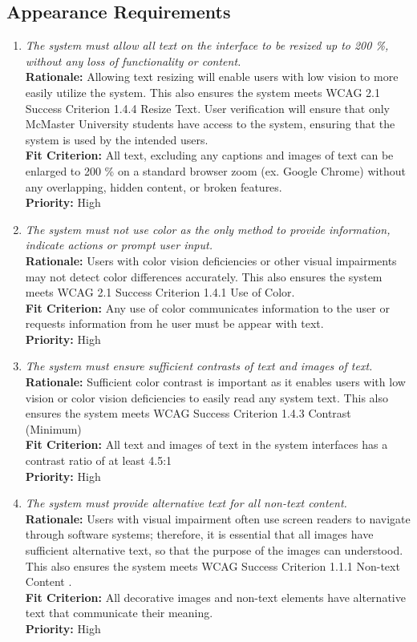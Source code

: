 \documentclass[12pt]{article}
\begin{document}
\subsection{Appearance Requirements}
\begin{enumerate}[label=LFR-AR \arabic*., wide=0pt, leftmargin=*]
  \item \emph{The system must allow all text on the interface to be resized up to 200 \%, without any loss of functionality or content. }\\[2mm] 
    {\bf Rationale:} Allowing text resizing will enable users with low vision to more easily utilize the system. This also ensures the system meets WCAG 2.1 Success Criterion 1.4.4 Resize Text.
    User verification will ensure that only McMaster University students have access to the system, ensuring that the system is used by the intended users.  \\
    {\bf Fit Criterion:} All text, excluding any captions and images of text can be enlarged to 200 \% on a standard browser zoom (ex. Google Chrome) without any overlapping, hidden content, or broken features.  \\
    {\bf Priority:} High
  \item \emph{The system must not use color as the only method to provide information, indicate actions or prompt user input.}\\[2mm] 
    {\bf Rationale:} Users with color vision deficiencies or other visual impairments may not detect color differences accurately. This also ensures the system meets WCAG 2.1 Success Criterion 1.4.1 Use of Color.\\
    {\bf Fit Criterion:} Any use of color communicates information to the user or requests information from he user must be appear with text.  \\
    {\bf Priority:} High
  \item \emph{The system must ensure sufficient contrasts of text and images of text.}\\[2mm] 
    {\bf Rationale:} Sufficient color contrast is important as it enables users with low vision or color vision deficiencies to easily read any system text. This also ensures the system meets WCAG Success Criterion 1.4.3 Contrast (Minimum)\\
    {\bf Fit Criterion:}  All text and images of text in the system interfaces has a contrast ratio of at least 4.5:1  \\
    {\bf Priority:} High
  \item \emph{The system must provide alternative text for all non-text content.}\\[2mm] 
    {\bf Rationale:} Users with visual impairment often use screen readers to navigate through software systems; therefore, it is essential that all images have sufficient alternative text, so that the purpose of the images can understood. This also ensures the system meets WCAG Success Criterion 1.1.1 Non-text Content  .\\
    {\bf Fit Criterion:} All decorative images and non-text elements have alternative text that communicate their meaning. \\
    {\bf Priority:} High
\end{enumerate}
\end{document}
